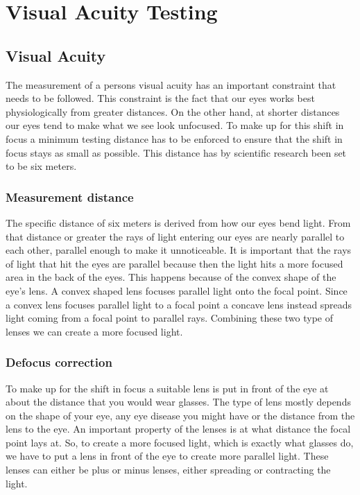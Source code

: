 \documentclass[12pt,a4paper,notitlepage]{report}
\begin{document}
\chapter{ Visual Acuity Testing}
\section{Visual Acuity}
The measurement of a persons visual acuity has an important constraint that needs to be followed. This constraint is the fact that our eyes works best physiologically from greater distances. On the other hand, at shorter distances our eyes tend to make what we see look unfocused. To make up for this shift in focus a minimum testing distance has to be enforced to ensure that the shift in focus stays as small as possible. This distance has by scientific research been set to be six meters. \cite{Acuity_Book}

\subsection{Measurement distance}
The specific distance of six meters is derived from how our eyes bend light. From that distance or greater the rays of light entering our eyes are nearly parallel to each other, parallel enough to make it unnoticeable. It is important that the rays of light that hit the eyes are parallel because then the light hits a more focused area in the back of the eyes. This happens because of the convex shape of the eye's lens. A convex shaped lens focuses parallel light onto the focal point. Since a convex lens focuses parallel light to a focal point a concave lens instead spreads light coming from a focal point to parallel rays. Combining these two type of lenses we can create a more focused light. \cite{Optics_Book}

\subsection{Defocus correction}
To make up for the shift in focus a suitable lens is put in front of the eye at about the distance that you would wear glasses. The type of lens mostly depends on the shape of your eye, any eye disease you might have or the distance from the lens to the eye. An important property of the lenses is at what distance the focal point lays at. So, to create a more focused light, which is exactly what glasses do, we have to put a lens in front of the eye to create more parallel light. These lenses can either be plus or minus lenses, either spreading or contracting the light. \cite{Optics_Book}
\end{document}
